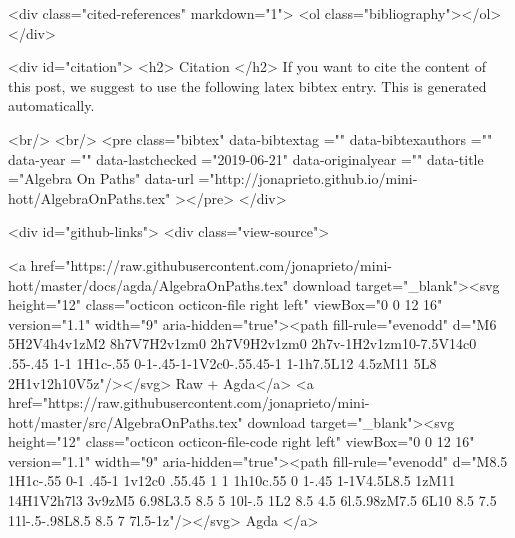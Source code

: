   <div class="cited-references" markdown="1">
  <ol class="bibliography"></ol>
  </div>


  
  <div id="citation">
  <h2> Citation </h2>
  If you want to cite the content of this post,
  we suggest to use the following latex bibtex entry.
  This is generated automatically.

  <br/>
  <br/>
  <pre class="bibtex"
       data-bibtextag =""
       data-bibtexauthors =""
       data-year =""
       data-lastchecked ="2019-06-21"
       data-originalyear =""
       data-title ="Algebra On Paths"
       data-url ="http://jonaprieto.github.io/mini-hott/AlgebraOnPaths.tex"
  ></pre>
  </div>
  

  <div id="github-links">
    <div class="view-source">
      
        <a href="https://raw.githubusercontent.com/jonaprieto/mini-hott/master/docs/agda/AlgebraOnPaths.tex" download target="_blank"><svg height="12" class="octicon octicon-file right left" viewBox="0 0 12 16" version="1.1" width="9" aria-hidden="true"><path fill-rule="evenodd" d="M6 5H2V4h4v1zM2 8h7V7H2v1zm0 2h7V9H2v1zm0 2h7v-1H2v1zm10-7.5V14c0 .55-.45 1-1 1H1c-.55 0-1-.45-1-1V2c0-.55.45-1 1-1h7.5L12 4.5zM11 5L8 2H1v12h10V5z"/></svg> Raw + Agda</a>
        <a href="https://raw.githubusercontent.com/jonaprieto/mini-hott/master/src/AlgebraOnPaths.tex" download target="_blank"><svg height="12" class="octicon octicon-file-code right left" viewBox="0 0 12 16" version="1.1" width="9" aria-hidden="true"><path fill-rule="evenodd" d="M8.5 1H1c-.55 0-1 .45-1 1v12c0 .55.45 1 1 1h10c.55 0 1-.45 1-1V4.5L8.5 1zM11 14H1V2h7l3 3v9zM5 6.98L3.5 8.5 5 10l-.5 1L2 8.5 4.5 6l.5.98zM7.5 6L10 8.5 7.5 11l-.5-.98L8.5 8.5 7 7l.5-1z"/></svg> Agda </a>
      
